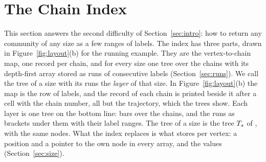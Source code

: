 \section{The Chain Index}\label{sec:index}

This section answers the second difficulty of Section~\ref{sec:intro}: how to return any community of any size as a few ranges of labels.
%
The index has three parts, drawn in Figure~\ref{fig:layout}(b) for the running example.
%
They are the vertex-to-chain map, one record per chain, and for every size one tree over the chains with its depth-first array stored as runs of consecutive labels (Section~\ref{sec:runs}).
%
We call the tree of a size with its runs the \textit{layer} of that size.
%
In Figure~\ref{fig:layout}(b) the map is the row of labels, and the record of each chain is printed beside it after a cell with the chain number, all but the trajectory, which the trees show.
%
Each layer is one tree on the bottom line: bars over the chains, and the runs as brackets under them with their label ranges.
%
The tree of a size is the tree $T_{s}$ of \strees, with the same nodes.
%
What the index replaces is what \strees stores per vertex: a position and a pointer to the own node in every array, and the values (Section~\ref{sec:size}).


